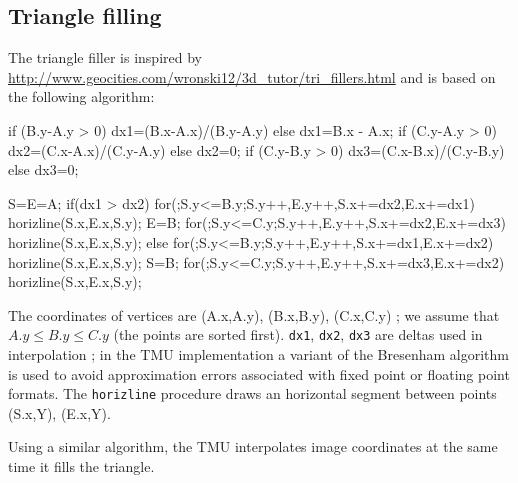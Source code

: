 \documentclass[a4paper,11pt]{article}
\begin{document}
\subsection{Triangle filling}
The triangle filler is inspired by \url{http://www.geocities.com/wronski12/3d_tutor/tri_fillers.html} and is based on the following algorithm:
\begin{verbatimtab}
if (B.y-A.y > 0) dx1=(B.x-A.x)/(B.y-A.y) else dx1=B.x - A.x;
if (C.y-A.y > 0) dx2=(C.x-A.x)/(C.y-A.y) else dx2=0;
if (C.y-B.y > 0) dx3=(C.x-B.x)/(C.y-B.y) else dx3=0;

S=E=A;
if(dx1 > dx2) {
	for(;S.y<=B.y;S.y++,E.y++,S.x+=dx2,E.x+=dx1)
		horizline(S.x,E.x,S.y);
	E=B;
	for(;S.y<=C.y;S.y++,E.y++,S.x+=dx2,E.x+=dx3)
		horizline(S.x,E.x,S.y);
} else {
	for(;S.y<=B.y;S.y++,E.y++,S.x+=dx1,E.x+=dx2)
		horizline(S.x,E.x,S.y);
	S=B;
	for(;S.y<=C.y;S.y++,E.y++,S.x+=dx3,E.x+=dx2)
		horizline(S.x,E.x,S.y);
}
\end{verbatimtab}

The coordinates of vertices are (A.x,A.y), (B.x,B.y), (C.x,C.y) ; we assume that $A.y \leq B.y \leq C.y$ (the points are sorted first). \verb!dx1!, \verb!dx2!, \verb!dx3! are deltas used in interpolation ; in the TMU implementation a variant of the Bresenham algorithm is used to avoid approximation errors associated with fixed point or floating point formats. The \verb!horizline! procedure draws an horizontal segment between points (S.x,Y), (E.x,Y).

Using a similar algorithm, the TMU interpolates image coordinates at the same time it fills the triangle.
\end{document}
